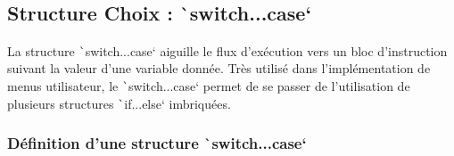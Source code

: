\documentclass[10pt]{article}
\begin{document}
\subsection{Structure Choix : \texttt`switch...case`}
La structure \texttt`switch...case` aiguille le flux d'exécution vers un bloc d'instruction suivant la valeur d'une variable donnée. Très utilisé dans l'implémentation de menus utilisateur, le \texttt`switch...case` permet de se passer de l'utilisation de plusieurs structures \texttt`if...else` imbriquées.

\subsubsection{Définition d'une structure \texttt`switch...case`}
\end{document}
